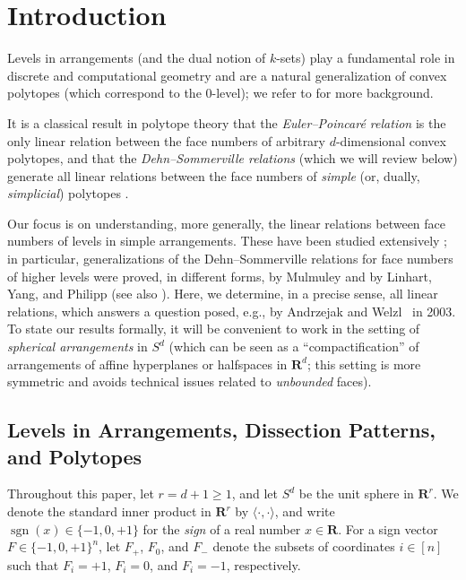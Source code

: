 \documentclass[a4paper,USenglish,cleveref, autoref, thm-restate,nolineno]{socg-lipics-v2021}
\DeclareMathOperator{\sgn}{sgn}
\renewcommand{\geq}{\geqslant}
\newcommand{\R}{\mathbf{R}}
\begin{document}
\section{Introduction}
\label{s:intro}
Levels in arrangements (and the dual notion of $k$-sets) play a fundamental role in discrete and computational geometry %
and %
are a natural generalization of convex polytopes (which correspond to the $0$-level); we refer to  \cite{Edelsbrunner:1987aa,Matousek:2002aa,Wagner:2008aa} for more background.

It is a classical result in polytope theory that the \emph{Euler--Poincaré relation} is the only linear relation between the face numbers of arbitrary $d$-dimensional convex polytopes, and that the \emph{Dehn--Sommerville relations} 
(which we will review below) 
generate all linear relations between the face numbers of \emph{simple} (or, dually, \emph{simplicial}) polytopes \cite[Chs.~8--9]{Grunbaum:2003aa}. 

Our focus is on understanding, more generally, the linear relations between face numbers of levels in simple arrangements. These have been studied extensively \cite{Mulmuley:1993aa,Gulliksen:1997aa,Linhart:2000aa,Andrzejak:2003aa,Biswas:2024aa}; in particular, 
generalizations of the Dehn--Sommerville relations for face numbers of higher levels were proved, in different forms, by Mulmuley \cite{Mulmuley:1993aa} and by Linhart, Yang, and Philipp \cite{Linhart:2000aa} (see also \cite{Biswas:2024aa}). Here, we determine, in a precise sense, all linear relations, which answers a question posed, e.g., by Andrzejak and Welzl~\cite{Andrzejak:2003aa} in 2003. To state our results formally, it will be convenient to work in the setting of \emph{spherical arrangements} in $S^d$ (which can be seen as a ``compactification'' of arrangements of affine hyperplanes or halfspaces in $\R^d$; this setting is more symmetric and avoids technical issues related to \emph{unbounded} faces). 

\subsection{Levels in Arrangements, Dissection Patterns, and Polytopes}
\label{sec:arrangments}
Throughout this paper, let $r=d+1 \geq 1$, and let $S^d$ be the unit sphere in $\R^r$. We denote the standard inner product in $\R^r$ by $\langle\cdot ,\cdot \rangle$, and write $\sgn(x)\in \{-1,0,+1\}$ for the \emph{sign} of a real number 
$x\in \R$. %
For a sign vector $F\in \{-1,0,+1\}^n$, let $F_+$, $F_0$, and $F_-$ denote the subsets of coordinates $i\in [n]$ such that $F_i=+1$, $F_i=0$, and $F_i=-1$, respectively.
\end{document}
